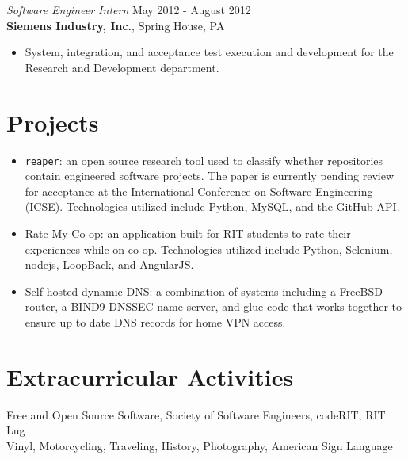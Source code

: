 \documentclass[margin]{res}
\begin{document}
\begin{resume}
{\sl Software Engineer Intern} \hfill May 2012 - August 2012 \\
\textbf{Siemens Industry, Inc.}, Spring House, PA
\begin{itemize}
    \item System, integration, and acceptance test execution and development
          for the Research and Development department.
\end{itemize} 

\section{Projects}

\begin{itemize}
    \item \texttt{reaper}: an open source research tool used to classify
          whether repositories contain engineered software projects. The paper
          is currently pending review for acceptance at the International
          Conference on Software Engineering (ICSE). Technologies utilized
          include Python, MySQL, and the GitHub API.
    \item Rate My Co-op: an application built for RIT students to rate
          their experiences while on co-op. Technologies utilized include
          Python, Selenium, nodejs, LoopBack, and AngularJS.
    \item Self-hosted dynamic DNS: a combination of systems including a FreeBSD
          router, a BIND9 DNSSEC name server, and glue code that works together
          to ensure up to date DNS records for home VPN access.
\end{itemize}

\section{Extracurricular Activities}

Free and Open Source Software, Society of Software Engineers, codeRIT, RIT Lug \\
Vinyl, Motorcycling, Traveling, History, Photography, American Sign Language

\end{resume}
\end{document}
